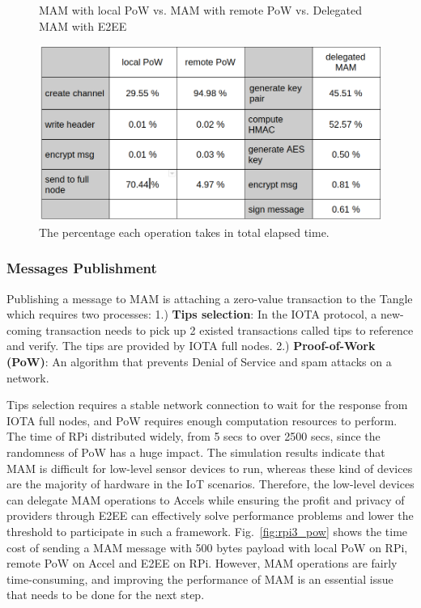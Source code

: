\documentclass[10pt, conference, compsocconf]{IEEEtran}
\begin{document}
\begin{figure}[!htb]
  \caption{MAM with local PoW \newline vs. MAM with remote PoW \newline vs. Delegated MAM with E2EE}\label{fig:rpi3_pow}  
\endminipage\hfill
{}%
  \includegraphics[width=\linewidth]{op_share}
  \caption{The percentage each operation takes in total elapsed time.}\label{fig:op_share}  
\endminipage
\end{figure}

\subsubsection{Messages Publishment}
Publishing a message to MAM is attaching a zero-value transaction to the Tangle which requires two processes: 1.) \textbf{Tips selection}: In the IOTA protocol, a new-coming transaction needs to pick up 2 existed transactions called tips to reference and verify. The tips are provided by IOTA full nodes. 2.) \textbf{Proof-of-Work (PoW)}: An algorithm that prevents Denial of Service and spam attacks on a network.

Tips selection requires a stable network connection to wait for the response from IOTA full nodes, and PoW requires enough computation resources to perform. The time of RPi distributed widely, from 5 secs to over 2500 secs, since the randomness of PoW has a huge impact. The simulation results indicate that MAM is difficult for low-level sensor devices to run, whereas these kind of devices are the majority of hardware in the IoT scenarios. Therefore, the low-level devices can delegate MAM operations to Accels while ensuring the profit and privacy of providers through E2EE can effectively solve performance problems and lower the threshold to participate in such a framework. Fig.~\ref{fig:rpi3_pow} shows the time cost of sending a MAM message with 500 bytes payload with local PoW on RPi, remote PoW on Accel and E2EE on RPi. However, MAM operations are fairly time-consuming, and improving the performance of MAM is an essential issue that needs to be done for the next step.
\end{document}
